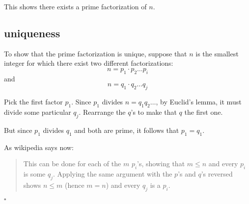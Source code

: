\documentclass[11pt, oneside]{article}
\begin{document}
This shows there exists a prime factorization of $n$.

\subsection*{uniqueness}

To show that the prime factorization is unique, suppose that $n$ is the smallest integer for which there exist two different factorizations:
\[ n = p_1 \cdot p_2 \dots p_i \]
and
\[ n = q_1 \cdot q_2 \dots q_j \]

Pick the first factor $p_1$.  Since $p_1$ divides $n = q_1 q_2 \dots$, by Euclid's lemma, it must divide some particular $q_j$.  Rearrange the $q$'s to make that $q$ the first one.

But since $p_1$ divides $q_1$ and both are prime, it follows that $p_1 = q_1$.

As wikipedia says now:

\begin{quote}This can be done for each of the $m$ $p_i$'s, showing that $m \le n$ and every $p_i$ is some $q_j$.  Applying the same argument with the $p$'s and $q$'s reversed shows $n \le m$ (hence $m = n$) and every $q_j$ is a $p_i$.\end{quote}

$\square$
\end{document}
